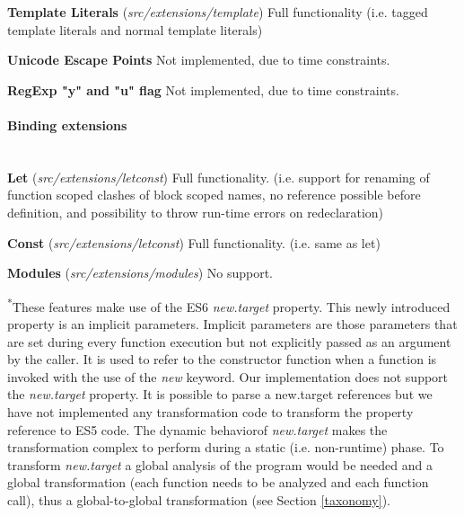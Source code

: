 \textbf{Template Literals} (\textit{src/extensions/template})
Full functionality (i.e. tagged template literals and normal template literals)

\textbf{Unicode Escape Points}
Not implemented, due to time constraints.

\textbf{RegExp "y" and "u" flag}
Not implemented, due to time constraints.

\paragraph{Binding extensions}\mbox{}\\
\textbf{Let} (\textit{src/extensions/letconst}) \newline
Full functionality. (i.e. support for renaming of function scoped clashes of block scoped names, no reference possible before definition, and possibility to throw run-time errors on redeclaration)

\textbf{Const} (\textit{src/extensions/letconst}) \newline
Full functionality. (i.e. same as let)

\textbf{Modules} (\textit{src/extensions/modules})
No support.

\textsuperscript{*}These features make use of the ES6 \textit{new.target} property. This newly introduced property is an implicit parameters. Implicit parameters are those parameters that are set during every function execution but not explicitly passed as an argument by the caller. It is used to refer to the constructor function when a function is invoked with the use of the \textit{new} keyword.
Our implementation does not support the \textit{new.target} property. It is possible to parse a new.target references but we have not implemented any transformation code to transform the property reference to ES5 code. The dynamic behavior\footnotemark of \textit{new.target} makes the transformation complex to perform during a static (i.e. non-runtime) phase. To transform \textit{new.target} a global analysis of the program would be needed and a global transformation (each function needs to be analyzed and each function call), thus a global-to-global transformation (see Section \ref{taxonomy}).


